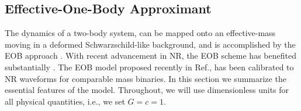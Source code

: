 \documentclass[aps,
prd,
amsmath,
amssymb,
twocolumn,
floatfix,
groupedaddress]{revtex4-1}
\begin{document}
\subsection{Effective-One-Body Approximant}\label{sec:level2:EOBNRv2}
The dynamics of a two-body system, can be mapped onto an effective-mass moving in a deformed Schwarzschild-like background, and is accomplished by the EOB approach \citep{EOBOriginalBuonannoDamour}. With recent advancement in NR, the EOB scheme has benefited substantially \cite{EOBdevel01,EOBdevel02,EOBNRdevel03,DamourFluxhlm01,EOBNRdevel01}. The EOB model proposed recently in Ref.\citep{BuonannoEOBv2Main}, has been calibrated to NR waveforms for comparable mass binaries. In this section we summarize the essential features of the model. Throughout, we will use dimensionless units for all physical quantities, i.e., we set $G=c=1$.
\end{document}
